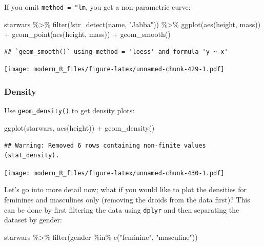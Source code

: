 \documentclass[
]{article}
\newenvironment{Shaded}{\begin{snugshade}}{\end{snugshade}}
\newcommand{\FunctionTok}[1]{\textcolor[rgb]{0.00,0.00,0.00}{#1}}
\newcommand{\NormalTok}[1]{#1}
\newcommand{\SpecialCharTok}[1]{\textcolor[rgb]{0.00,0.00,0.00}{#1}}
\newcommand{\StringTok}[1]{\textcolor[rgb]{0.31,0.60,0.02}{#1}}
\begin{document}
If you omit \texttt{method\ =\ "lm}, you get a non-parametric curve:

\begin{Shaded}
\begin{Highlighting}[]
\NormalTok{starwars }\SpecialCharTok{\%\textgreater{}\%}
  \FunctionTok{filter}\NormalTok{(}\SpecialCharTok{!}\FunctionTok{str\_detect}\NormalTok{(name, }\StringTok{"Jabba"}\NormalTok{)) }\SpecialCharTok{\%\textgreater{}\%}
  \FunctionTok{ggplot}\NormalTok{(}\FunctionTok{aes}\NormalTok{(height, mass)) }\SpecialCharTok{+}
  \FunctionTok{geom\_point}\NormalTok{(}\FunctionTok{aes}\NormalTok{(height, mass)) }\SpecialCharTok{+}
  \FunctionTok{geom\_smooth}\NormalTok{()}
\end{Highlighting}
\end{Shaded}

\begin{verbatim}
## `geom_smooth()` using method = 'loess' and formula 'y ~ x'
\end{verbatim}

\texttt{[image: modern\_R\_files/figure-latex/unnamed-chunk-429-1.pdf]}

\hypertarget{density}{%
\subsubsection{Density}\label{density}}

Use \texttt{geom\_density()} to get density plots:

\begin{Shaded}
\begin{Highlighting}[]
\FunctionTok{ggplot}\NormalTok{(starwars, }\FunctionTok{aes}\NormalTok{(height)) }\SpecialCharTok{+}
  \FunctionTok{geom\_density}\NormalTok{()}
\end{Highlighting}
\end{Shaded}

\begin{verbatim}
## Warning: Removed 6 rows containing non-finite values (stat_density).
\end{verbatim}

\texttt{[image: modern\_R\_files/figure-latex/unnamed-chunk-430-1.pdf]}

Let's go into more detail now; what if you would like to plot the densities for feminines and masculines
only (removing the droids from the data first)? This can be done by first filtering the data using
\texttt{dplyr} and then separating the dataset by gender:

\begin{Shaded}
\begin{Highlighting}[]
\NormalTok{starwars }\SpecialCharTok{\%\textgreater{}\%}
  \FunctionTok{filter}\NormalTok{(gender }\SpecialCharTok{\%in\%} \FunctionTok{c}\NormalTok{(}\StringTok{"feminine"}\NormalTok{, }\StringTok{"masculine"}\NormalTok{))}
\end{Highlighting}
\end{Shaded}
\end{document}
